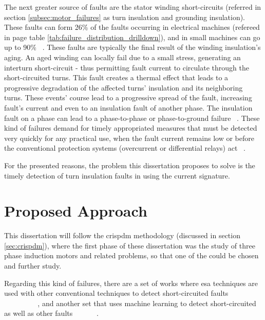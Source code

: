 The next greater source of faults are the stator winding short-circuits (referred in section \ref{subsec:motor_failures} as turn insulation and grounding insulation). These faults can form 26\% of the faults occurring in electrical machines (refereed in page \pageref{tab:failure_distribution_drilldown} table \ref{tab:failure_distribution_drilldown}), and in small machines can go up to 90\% ~\cite{Riera-Guasp2015}. These faults are typically the final result of the winding insulation's aging. An aged winding can locally fail due to a small stress, generating an interturn short-circuit - thus permitting fault current to circulate through the short-circuited turns. This fault creates a thermal effect that leads to a progressive degradation of the affected turns' insulation and its neighboring turns. These events' course lead to a progressive spread of the fault, increasing fault's current and even to an insulation fault of another phase. The insulation fault on a phase can lead to a phase-to-phase or phase-to-ground failure ~\cite{Riera-Guasp2015}. These kind of failures demand for timely appropriated measures that must be detected very quickly for any practical use, when the fault current remains low or before the conventional protection systems (overcurrent or differential relays) act ~\cite{Riera-Guasp2015}.

For the presented reasons, the problem this dissertation proposes to solve is the timely detection of turn insulation faults in  using the current signature.





\section{Proposed Approach} %
\label{sec:proposed_approach}

This dissertation will follow the \acrlong{crispdm} methodology (discussed in section \ref{sec:crispdm}), where the first phase of these dissertation was the study of three phase induction motors and related problems, so that one of the could be chosen and further study. 

Regarding this kind of failures, there are a set of works where \Acrshort{esa} techniques are used with other conventional techniques to detect short-circuited faults ~\cite{Ourici2012} ~\cite{Cheng2011} ~\cite{Joksimovic2013} ~\cite{Cruz2001} ~\cite{Cabanas2013} ~\cite{Gandhi2011} ~\cite{Kia2013} ~\cite{M.a2014} ~\cite{Bouzid2013} ~\cite{Bakhri2012} ~\cite{Bakhri2012}, and another set that uses machine learning to detect short-circuited as well as other faults ~\cite{Toma2011} ~\cite{Wolkiewicz2013} ~\cite{Patel2016} ~\cite{Jagadanand2015}.

